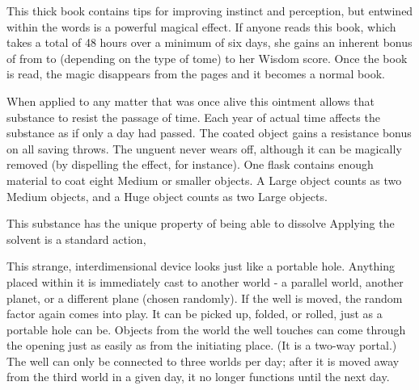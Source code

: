 {

 This thick book contains tips for improving instinct and perception, but entwined within the words is a powerful magical effect. If anyone reads this book, which takes a total of 48 hours over a minimum of six days, she gains an inherent bonus of from  to  (depending on the type of tome) to her Wisdom score. Once the book is read, the magic disappears from the pages and it becomes a normal book. 


 When applied to any matter that was once alive this ointment allows that substance to resist the passage of time. Each year of actual time affects the substance as if only a day had passed. The coated object gains a  resistance bonus on all saving throws. The unguent never wears off, although it can be magically removed (by dispelling the effect, for instance). One flask contains enough material to coat eight Medium or smaller objects. A Large object counts as two Medium objects, and a Huge object counts as two Large objects.


 This substance has the unique property of being able to dissolve  Applying the solvent is a standard action, 


 This strange, interdimensional device looks just like a portable hole. Anything placed within it is immediately cast to another world - a parallel world, another planet, or a different plane (chosen randomly). If the well is moved, the random factor again comes into play. It can be picked up, folded, or rolled, just as a portable hole can be. Objects from the world the well touches can come through the opening just as easily as from the initiating place. (It is a two-way portal.) The well can only be connected to three worlds per day; after it is moved away from the third world in a given day, it no longer functions until the next day.

}
